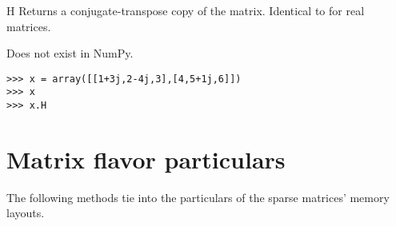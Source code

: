 \begin{memberdesc}[Matrix]{H}
  Returns a conjugate-transpose copy of the matrix.
  Identical to  for real matrices.

  Does not exist in NumPy.
\begin{verbatim}
>>> x = array([[1+3j,2-4j,3],[4,5+1j,6]])
>>> x
>>> x.H
\end{verbatim}
\end{memberdesc}

\section{Matrix flavor particulars}

The following methods tie into the particulars of the sparse matrices'
memory layouts.

